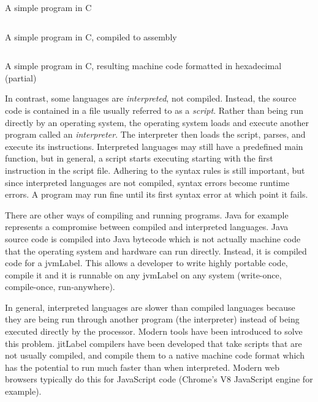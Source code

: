 \begin{listing}
\inputminted{c}{figures/squareRoot/squareRoot.c}
\caption{A simple program in C}
\label{code:c:squareRoot}
\end{listing}

\begin{listing}
\centering
\inputminted[fontsize=\tiny]{text}{figures/squareRoot/squareRoot.s}
\caption{A simple program in C, compiled to assembly}
\label{code:c:squareRootAssembly}
\end{listing}

\begin{listing}
\centering
\inputminted[fontsize=\scriptsize]{text}{figures/squareRoot/squareRoot.partial.txt}
\caption{A simple program in C, resulting machine code formatted in hexadecimal (partial)}
\label{code:c:squareRootMachine}
\end{listing}


In contrast, some languages are \emph{interpreted}, 
not compiled.  Instead, the source code is contained in a file usually referred
to as a \emph{script}.  Rather than being run directly by an operating system, 
the operating system loads and execute another program called an \emph{interpreter}.
The interpreter then loads the script, parses, and execute its instructions.
Interpreted languages may still have a predefined main function, but in 
general, a script starts executing starting with the first instruction in the
script file.  Adhering to the syntax rules is still important, but since interpreted
languages are not compiled, syntax errors become runtime errors.  A program
may run fine until its first syntax error at which point it fails.  

There are other ways of compiling and running programs.  Java for example
represents a compromise between compiled and interpreted languages.
Java source code is compiled into Java bytecode which is not actually machine
code that the operating system and hardware can run directly.  Instead, it is
compiled code for a \gls{jvmLabel}.  This allows a developer to write highly
portable code, compile it and it is runnable on any \gls{jvmLabel} on any system
(write-once, compile-once, run-anywhere).  

In general, interpreted languages are slower than compiled languages because
they are being run through another program (the interpreter) instead of
being executed directly by the processor.  Modern tools
have been introduced to solve this problem.  \gls{jitLabel} compilers have
been developed that take scripts that are not usually compiled, and compile
them to a native machine code format which has the potential to run 
much faster than when interpreted.  Modern web browsers typically do this
for JavaScript code (Chrome's V8 JavaScript engine for example).

